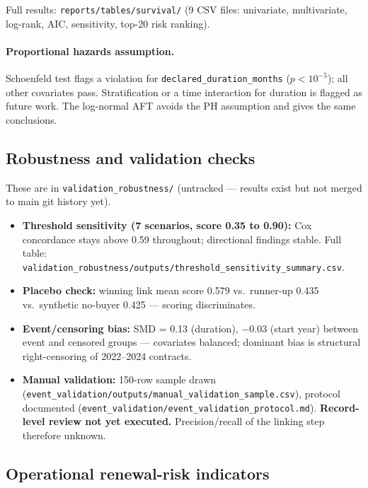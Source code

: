 \documentclass[11pt,a4paper]{article}
\begin{document}
Full results: \nolinkurl{reports/tables/survival/} (9 CSV files: univariate,
multivariate, log-rank, AIC, sensitivity, top-20 risk ranking).

\paragraph{Proportional hazards assumption.} Schoenfeld test flags a violation
for \nolinkurl{declared_duration_months} ($p < 10^{-5}$); all other covariates
pass. Stratification or a time interaction for duration is flagged as future
work. The log-normal AFT avoids the PH assumption and gives the same conclusions.

\subsection{Robustness and validation checks}
\label{sec:robustness}

These are in \nolinkurl{validation_robustness/} (untracked --- results exist but
not merged to main git history yet).

\begin{itemize}[leftmargin=1.4em,itemsep=1pt]
  \item \textbf{Threshold sensitivity (7 scenarios, score 0.35 to 0.90):}
        Cox concordance stays above 0.59 throughout; directional findings stable.
        Full table: \nolinkurl{validation_robustness/outputs/threshold_sensitivity_summary.csv}.
  \item \textbf{Placebo check:} winning link mean score 0.579 vs.\ runner-up
        0.435 vs.\ synthetic no-buyer 0.425 --- scoring discriminates.
  \item \textbf{Event/censoring bias:} SMD = 0.13 (duration), $-$0.03 (start year)
        between event and censored groups --- covariates balanced; dominant
        bias is structural right-censoring of 2022--2024 contracts.
  \item \textbf{Manual validation:} 150-row sample drawn
        (\nolinkurl{event_validation/outputs/manual_validation_sample.csv}),
        protocol documented (\nolinkurl{event_validation/event_validation_protocol.md}).
        \textbf{Record-level review not yet executed.}
        Precision/recall of the linking step therefore unknown.
\end{itemize}

\subsection{Operational renewal-risk indicators}
\label{sec:operational}
\end{document}
